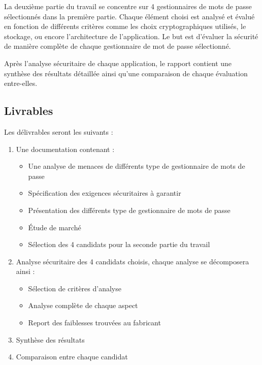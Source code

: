 La deuxième partie du travail se concentre sur 4 gestionnaires de mots de passe sélectionnés dans la première partie. Chaque élément choisi est analysé et évalué en fonction de différents critères comme les choix cryptographiques utilisés, le stockage, ou encore l'architecture de l'application. Le but est d'évaluer la sécurité de manière complète de chaque gestionnaire de mot de passe sélectionné. 

Après l'analyse sécuritaire de chaque application, le rapport contient une synthèse des résultats détaillée ainsi qu'une comparaison de chaque évaluation entre-elles. 



\subsection*{Livrables}
Les délivrables seront les suivants :
\begin{enumerate}
\item Une documentation contenant :
	\begin{itemize}
	\item Une analyse de menaces de différents type de gestionnaire de mots de passe
	\item Spécification des exigences sécuritaires à garantir
	\item Présentation des différents type de gestionnaire de mots de passe
	\item Étude de marché
	\item Sélection des 4 candidats pour la seconde partie du travail
	\end{itemize}
\item Analyse sécuritaire des 4 candidats choisis, chaque analyse se décomposera ainsi :
	\begin{itemize}
		\item Sélection de critères d'analyse
		\item Analyse complète de chaque aspect
		\item Report des faiblesses trouvées au fabricant
	\end{itemize}
\item Synthèse des résultats
\item Comparaison entre chaque candidat
\end{enumerate}

